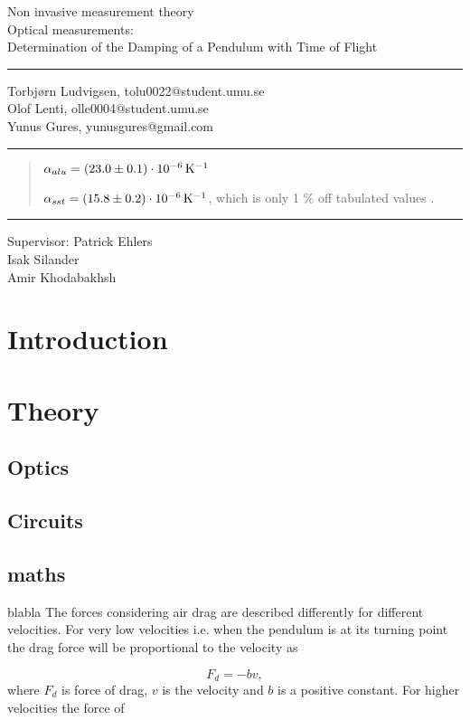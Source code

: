 \documentclass[11pt, a4paper]{article}
\date{\todayswe}
\makeatletter
\def\contacts{Torbjørn Ludvigsen, tolu0022@student.umu.se\\Olof Lenti, olle0004@student.umu.se\\
Yunus Gures, yunusgures@gmail.com}
\def\course{Non invasive measurement theory}
\def\lab{Optical measurements:\\Determination of the Damping of a Pendulum with Time of Flight}
\def\supervisors{Patrick Ehlers\\Isak Silander\\ Amir Khodabakhsh}
\makeatother
\begin{document}
\pagestyle{fancy}
\begin{titlepage}
	\begin{center}
		\course\\
		\Large{\lab}\vspace{2mm}
		\hrule\vspace{2mm}
		\tiny{\contacts}\vspace{2mm}
		\hrule
	\end{center}
	\vspace{4mm}

	\begin{abstract}

  $\alpha_{alu} =\unit[(23.0 \pm 0.1)\cdot10^{-6}]{K^{-1}}$ 

  $\alpha_{sst} = \unit[(15.8 \pm 0.2)\cdot10^{-6}]{K^{-1}}$, 
    which is only 1 \% off tabulated values \cite{ph, thex}.

	\end{abstract}
	\vfill
	\hrule\vspace{2mm}
	\centering
		\tiny{Supervisor: \supervisors}
\end{titlepage}

\pagestyle{plain}
\vspace{2cm}
\section{Introduction}

\section{Theory}
\subsection{Optics}
\subsection{Circuits}
\subsection{maths}

blabla
The forces considering air drag are described differently for different velocities. For very low velocities i.e. when the pendulum is at its turning point the drag force will be proportional to the velocity as

\[
F_d = -bv,
\]
where $F_d$ is force of drag, $v$ is the velocity and $b$ is a positive constant.
For higher velocities the force of 
\end{document}
